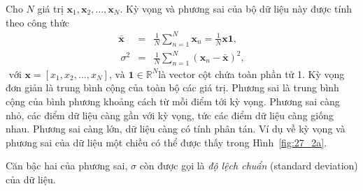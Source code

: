 \documentclass[12pt,a4paper,oneside]{report}
\numberwithin{equation}{section}
\begin{document}
Cho $N$ giá trị $\mathbf{x}_1, \mathbf{x}_2, \dots, \mathbf{x}_N$. {Kỳ vọng} và {phương sai}
của bộ dữ liệu này được tính theo công thức
\begin{eqnarray} 
	\bar{\mathbf{x}} &=& \frac{1}{N}\sum_{n=1}^N \mathbf{x}_n = \frac{1}{N}\mathbf{x1},\\\ 
	\sigma^2 &=& \frac{1}{N} \sum_{n=1}^N (\mathbf{x}_n - \bar{\mathbf{x}})^2,
\end{eqnarray} 
$\text { với } \mathbf{x}=\left[x_1, x_2, \ldots, x_N\right] \text {, và } \mathbf{1} \in \mathbb{R}^N$là
vector cột chứa toàn phần tử 1. Kỳ vọng đơn giản là trung bình cộng của toàn bộ
các giá trị. Phương sai là trung bình cộng của bình phương khoảng cách từ mỗi
điểm tới kỳ vọng. Phương sai càng nhỏ, các điểm dữ liệu càng gần với kỳ vọng,
tức các điểm dữ liệu càng giống nhau. Phương sai càng lớn, dữ liệu càng có tính
phân tán. Ví dụ về kỳ vọng và phương sai của dữ liệu một chiều có thể được thấy
trong Hình~\ref{fig:27_2a}. 

Căn bậc hai của phương sai, $\sigma$ còn được gọi là \textit{độ lệch chuẩn} (standard deviation) của
dữ liệu.
\end{document}
